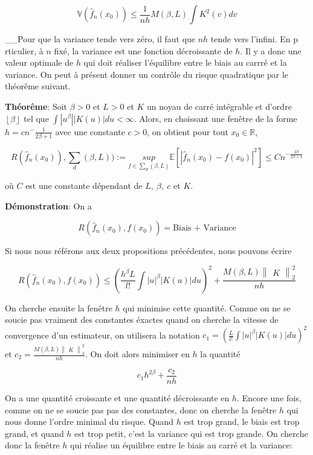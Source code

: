 \documentclass[
]{article}
\begin{document}
\[
 \mathbb{V}(\hat {f}_n(x_0))\leqslant\frac{1}{nh}M(\beta, L)\int K^2(v)dv 
\]

\_\_Pour que la variance tende vers zéro, il faut que \(nh\) tende vers
l'infini. En p rticulier, à \(n\) fixé, la variance est une fonction
décroissante de \(h\). Il y a donc une valeur optimale de \(h\) qui doit
réaliser l'équilibre entre le biais au carrré et la variance. On peut à
présent donner un contrôle du risque quadratique par le théorême
suivant.

\textbf{Théorême}: Soit \(\beta>0\) et \(L>0\) et \(K\) un noyau de
carré intégrable et d'ordre \(\left\lfloor{\beta}\right\rfloor\) tel que
\(\int |u^{\beta}||K(u)|du<\infty\). Alors, en choissant une fenêtre de
la forme \(h=cn^-\frac{1}{2\beta+1}\) avec une constante \(c>0\), on
obtient pour tout \(x_0 \in \mathbb{R}\),

\[ 
R(\hat {f}_n(x_0)),\sum_d(\beta, L)):= \underset{f\in\sum_d(\beta,L)}{sup}\mathbb{E}[|\hat {f}_n(x_0)-f(x_0)|^2]\leqslant Cn^{-\frac{2\beta}{2\beta+1}}
\]

où \(C\) est une constante dépendant de \(L,\  \beta, \ c\) et \(K\).

\textbf{Démonstration}: On a

\[
 R(\hat {f}_n(x_0),f(x_0))= \text{Biais + Variance}
\]

Si nous nous référons aux deux propositions précédentes, nous pouvons
écrire

\[
  R(\hat {f}_n(x_0),f(x_0))\leqslant(\frac{h^{\beta}L}{l!}\int |u|^{\beta}|K(u)|du)^2 + \frac{M(\beta,L)\begin{Vmatrix}K\end{Vmatrix}_2^2}{nh}
\]

On cherche ensuite la fenêtre \(h\) qui minimise cette quantité. Comme
on ne se soucie pas vraiment des constantes éxactes quand on cherche la
vitesse de convergence d'un estimateur, on utilisera la notation
\(c_1=(\frac{L}{l!}\int |u|^{\beta}|K(u)|du)^2\) et
\(c_2=\frac{M(\beta,L)\begin{Vmatrix}K\end{Vmatrix}_2^2}{nh}\). On doit
alors minimiser en \(h\) la quantité

\[
  c_1h^{2\beta}+\frac{c_2}{nh}
\]

On a une quantité croissante et une quantité décroissante en \(h\).
Encore une fois, comme on ne se soucie pas pas des constantes, donc on
cherche la fenêtre \(h\) qui nous donne l'ordre minimal du risque. Quand
\(h\) est trop grand, le biais est trop grand, et quand \(h\) est trop
petit, c'est la variance qui est trop grande. On cherche donc la fenêtre
\(h\) qui réalise un équilibre entre le biais au carré et la variance:
\end{document}
